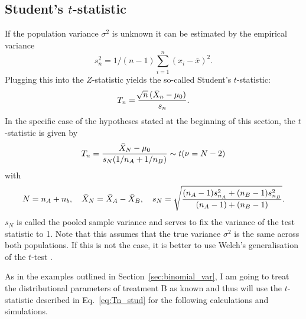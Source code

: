 \subsection{Student's \texorpdfstring{$t$}{t}-statistic}
\label{subsec:student's t-statistic}
If the population variance $\sigma^2$ is unknown it can be estimated by the empirical variance $${s_n^2 = 1/(n-1) \sum_{i=1}^n (x_i-\bar{x})^2}.$$ Plugging this into the $Z$-statistic yields the so-called Student's $t$-statistic:
\begin{align}
    T_n = \frac{\sqrt[]{n}\,(\bar{X}_n-\mu_0)}{s_n}.\label{eq:Tn_stud}
\end{align}
In the specific case of the hypotheses stated at the beginning of this section, the $t$-statistic is given by
$$T_n = \frac{\Bar{X}_{N}-\mu_0}{s_{N}(1/n_A+1/n_B)} \sim t(\nu = N-2)$$
with
$$N = n_A+n_b,\quad \Bar{X}_{N}=\Bar{X}_A-\Bar{X}_B,\quad s_{N} = \sqrt{\frac{(n_A-1)s_{n_A}^2+(n_B-1)s_{n_B}^2}{(n_A-1)+(n_B-1)}}.$$
$s_{N}$ is called the pooled sample variance and serves to fix the variance of the test statistic to 1. Note that this assumes that the true variance $\sigma^2$ is the same across both populations. If this is not the case, it is better to use Welch's generalisation of the $t$-test \citep{welch_generalization_1947}. \par As in the examples outlined in Section~\ref{sec:binomial_var}, I am going to treat the distributional parameters of treatment B as known and thus will use the $t$-statistic described in Eq.~\ref{eq:Tn_stud} for the following calculations and simulations. 

